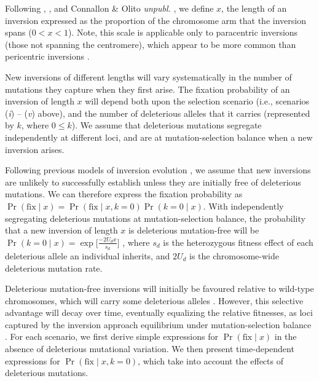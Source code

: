 \documentclass{article}
\newcommand\hl[1]{%
  \bgroup
  \hskip0pt\color{blue!80!black}%
  #1%
  \egroup
}
\begin{document}
Following \citet{vanValenLevins1968}, \citet{Santos1986}, and \hl{Connallon \& Olito {\itshape unpubl.}}, we define $x$, the length of an inversion expressed as the proportion of the chromosome arm that the inversion spans ($0 < x < 1$). Note, this scale is applicable only to paracentric inversions (those not spanning the centromere), which appear to be more common than pericentric inversions \citep{WellenreutherBernatchez2018}. 

New inversions of different lengths will vary systematically in the number of mutations they capture when they first arise. The fixation probability of an inversion of length $x$ will depend both upon the selection scenario (i.e., scenarios ({\itshape i}) -- ({\itshape v}) above), and the number of deleterious alleles that it carries (represented by $k$, where $0 \leq k$). We assume that deleterious mutations segregate independently at different loci, and are at mutation-selection balance when a new inversion arises. 

Following previous models of inversion evolution \citep{Nei1967, Santos1986, OrrKim1998, Connallon2018}, we assume that new inversions are unlikely to successfully establish unless they are initially free of deleterious mutations. We can therefore express the fixation probability as $\Pr(\text{fix} \mid x) = \Pr(\text{fix} \mid x, k=0) \Pr(k = 0 \mid x)$. With independently segregating deleterious mutations at mutation-selection balance, the probability that a new inversion of length $x$ is deleterious mutation-free will be $\Pr(k = 0 \mid x) = \exp \big[\frac{-2U_d x}{s_d} \big]$ \cite[e.g.][]{Nei1967,OrrKim1998}, where $s_d$ is the heterozygous fitness effect of each deleterious allele an individual inherits, and $2U_d$ is the chromosome-wide deleterious mutation rate. 

Deleterious mutation-free inversions will initially be favoured relative to wild-type chromosomes, which will carry some deleterious alleles \citep{Nei1967,OhtaKojima1968, KimuraOhta1970}. However, this selective advantage will decay over time, eventually equalizing the relative fitnesses, as loci captured by the inversion approach equilibrium under mutation-selection balance \citep{Nei1967}. For each scenario, we first derive simple expressions for $\Pr(\text{fix} \mid x)$ in the absence of deleterious mutational variation. We then present time-dependent expressions for $\Pr(\text{fix} \mid x, k=0)$, which take into account the effects of deleterious mutations.


\end{document}
